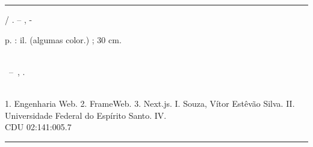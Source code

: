 \documentclass[
	12pt,				%
	openright,			%
	oneside,			%
	a4paper,			%
	english,			%
	french,				%
	spanish,			%
	brazil				%
	]{abntex2}
\begin{document}
\begin{fichacatalografica}
	\vspace*{\fill}
	\hrule
	\begin{center}
	\begin{minipage}[c]{12.5cm}
	
	\imprimirautor
	
	\hspace{0.5cm} \imprimirtitulo  / \imprimirautor. --
	\imprimirlocal, \imprimirdata-
	
	\hspace{0.5cm} \pageref{LastPage} p. : il. (algumas color.) ; 30 cm.\\
	
	\hspace{0.5cm} \imprimirorientadorRotulo~\imprimirorientador\\
	
	\hspace{0.5cm}
	\parbox[t]{\textwidth}{\imprimirtipotrabalho~--~\imprimirinstituicao,
	\imprimirdata.}\\
	
	\hspace{0.5cm}
		1. Engenharia Web.
		2. FrameWeb.
    3. Next.js.
		I. Souza, Vítor Estêvão Silva.
		II. Universidade Federal do Espírito Santo.
		IV. \imprimirtitulo \\ 			
	
	\hspace{8.75cm} CDU 02:141:005.7\\
	
	\end{minipage}
	\end{center}
	\hrule
\end{fichacatalografica}



% 
\end{document}
